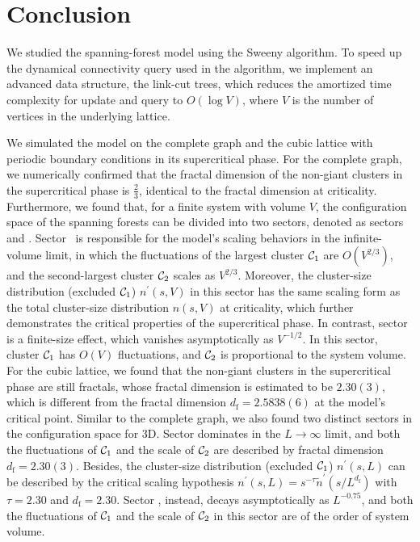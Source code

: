 \chapter{Conclusion}\label{chap:conclusion}

We studied the spanning-forest model using the Sweeny algorithm. To speed up the dynamical connectivity query 
used in the algorithm, we implement an advanced data structure, the link-cut trees, which reduces the amortized time complexity
for update and query to $O(\log V)$, where $V$ is the number of vertices in the underlying lattice. 

We simulated the model on the complete graph and the cubic lattice with periodic boundary conditions in its supercritical phase. For the complete graph,
we numerically confirmed that the fractal dimension of the non-giant clusters in the supercritical phase is $\frac{2}{3}$, identical to the fractal dimension at criticality. Furthermore, we found that, for a finite system with volume $V$, the configuration
space of the spanning forests can be divided into two sectors, denoted as sectors~ and . 
Sector~ is responsible for the model's scaling behaviors in the infinite-volume limit, in which 
the fluctuations of the largest cluster ${\mathcal C}_1$ are $O(V^{2/3})$, and the second-largest cluster ${\mathcal C}_2$ scales as $V^{2/3}$. 
Moreover, the cluster-size distribution (excluded ${\mathcal C}_1$) $n^\prime(s, V)$ in this sector has the same scaling form as the
total cluster-size distribution $n(s, V)$ at criticality, which further demonstrates the critical properties of the supercritical phase.
In contrast, sector~ is a finite-size effect, which vanishes asymptotically as $V^{-1/2}$. In this sector, 
cluster ${\mathcal C}_1$ has $O(V)$ fluctuations, and ${\mathcal C}_2$ is proportional to the system volume. For the cubic lattice, 
we found that the non-giant clusters in the supercritical phase are still fractals, whose fractal dimension is estimated to be $2.30(3)$, 
which is different from the fractal dimension $d_\text{f} = 2.5838(6)$ at the model's critical point. Similar to the complete graph, 
we also found two distinct sectors in the configuration space for 3D. Sector  dominates in the $L\to\infty$ limit,
and both the fluctuations of ${\mathcal C}_1$ and the scale of ${\mathcal C}_2$ are described by fractal dimension $d_\text{f} = 2.30(3)$. Besides,
the cluster-size distribution (excluded ${\mathcal C}_1$) $n^\prime(s, L)$ can be described by the critical scaling hypothesis $n^\prime(s, L) = s^{-\tau}\tilde{n}^\prime(s/L^{d_\text{f}})$
with $\tau = 2.30$ and $d_\text{f} = 2.30$. Sector , instead, decays asymptotically as $L^{-0.75}$, and both the fluctuations of ${\mathcal C}_1$ and the scale of ${\mathcal C}_2$ in this sector
are of the order of system volume.

